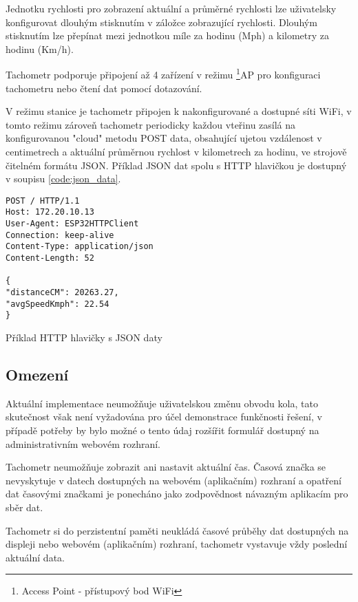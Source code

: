 \documentclass[twocolumn,a4paper,10pt]{article}
\begin{document}
Jednotku rychlosti pro zobrazení aktuální a průměrné rychlosti lze uživatelsky konfigurovat dlouhým stisknutím v záložce zobrazující rychlosti. Dlouhým stisknutím lze přepínat mezi jednotkou míle za hodinu (Mph) a kilometry za hodinu (Km/h).

Tachometr podporuje připojení až 4 zařízení v režimu \footnote{Access Point - přístupový bod WiFi}{AP} pro konfiguraci tachometru nebo čtení dat pomocí dotazování.

V režimu stanice je tachometr připojen k nakonfigurované a dostupné síti WiFi, v tomto režimu zároveň tachometr periodicky každou vteřinu zasílá na konfigurovanou "cloud" metodu POST data, obsahující ujetou vzdálenost v centimetrech a aktuální průměrnou rychlost v kilometrech za hodinu, ve strojově čitelném formátu JSON. Příklad JSON dat spolu s HTTP hlavičkou je dostupný v soupisu \ref{code:json_data}.

\begin{listing}[h]
\begin{verbatim}
POST / HTTP/1.1
Host: 172.20.10.13
User-Agent: ESP32HTTPClient
Connection: keep-alive
Content-Type: application/json
Content-Length: 52

{
"distanceCM": 20263.27,
"avgSpeedKmph": 22.54
}
\end{verbatim}
\caption{Příklad HTTP hlavičky s JSON daty} 
\label{code:json_data}
\end{listing}

\subsection{Omezení}\label{subsec:limits}
Aktuální implementace neumožňuje uživatelskou změnu obvodu kola, tato skutečnost však není vyžadována pro účel demonstrace funkčnosti řešení, v případě potřeby by bylo možné o tento údaj rozšířit formulář dostupný na administrativním webovém rozhraní.

Tachometr neumožňuje zobrazit ani nastavit aktuální čas. Časová značka se nevyskytuje v datech dostupných na webovém (aplikačním) rozhraní a opatření dat časovými značkami je ponecháno jako zodpovědnost návazným aplikacím pro sběr dat.

Tachometr si do perzistentní paměti neukládá časové průběhy dat dostupných na displeji nebo webovém (aplikačním) rozhraní, tachometr vystavuje vždy poslední aktuální data.
\end{document}
